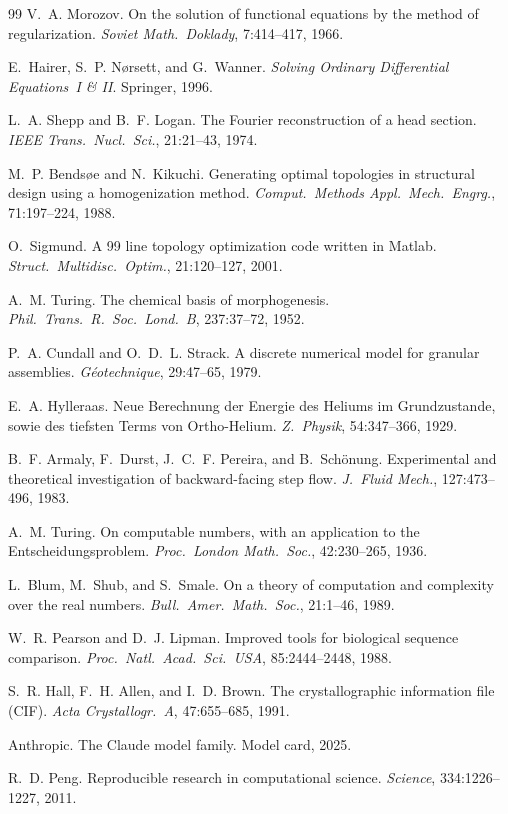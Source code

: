 \documentclass[11pt,a4paper]{article}
\begin{document}
\begin{thebibliography}{99}
V.~A. Morozov. On the solution of functional equations by the method of regularization. \emph{Soviet Math.\ Doklady}, 7:414--417, 1966.

E.~Hairer, S.~P. N{\o}rsett, and G.~Wanner. \emph{Solving Ordinary Differential Equations~I \& II}. Springer, 1996.


L.~A. Shepp and B.~F. Logan. The Fourier reconstruction of a head section. \emph{IEEE Trans.\ Nucl.\ Sci.}, 21:21--43, 1974.

M.~P. Bends{\o}e and N.~Kikuchi. Generating optimal topologies in structural design using a homogenization method. \emph{Comput.\ Methods Appl.\ Mech.\ Engrg.}, 71:197--224, 1988.

O.~Sigmund. A 99 line topology optimization code written in {Matlab}. \emph{Struct.\ Multidisc.\ Optim.}, 21:120--127, 2001.

A.~M. Turing. The chemical basis of morphogenesis. \emph{Phil.\ Trans.\ R.\ Soc.\ Lond.\ B}, 237:37--72, 1952.

P.~A. Cundall and O.~D.~L. Strack. A discrete numerical model for granular assemblies. \emph{G\'eotechnique}, 29:47--65, 1979.

E.~A. Hylleraas. Neue Berechnung der Energie des Heliums im Grundzustande, sowie des tiefsten Terms von Ortho-Helium. \emph{Z.\ Physik}, 54:347--366, 1929.

B.~F. Armaly, F.~Durst, J.~C.~F. Pereira, and B.~Sch{\"o}nung. Experimental and theoretical investigation of backward-facing step flow. \emph{J.\ Fluid Mech.}, 127:473--496, 1983.


A.~M. Turing. On computable numbers, with an application to the {E}ntscheidungsproblem. \emph{Proc.\ London Math.\ Soc.}, 42:230--265, 1936.

L.~Blum, M.~Shub, and S.~Smale. On a theory of computation and complexity over the real numbers. \emph{Bull.\ Amer.\ Math.\ Soc.}, 21:1--46, 1989.


W.~R. Pearson and D.~J. Lipman. Improved tools for biological sequence comparison. \emph{Proc.\ Natl.\ Acad.\ Sci.\ USA}, 85:2444--2448, 1988.

S.~R. Hall, F.~H. Allen, and I.~D. Brown. The crystallographic information file ({CIF}). \emph{Acta Crystallogr.\ A}, 47:655--685, 1991.



Anthropic. The {Claude} model family. Model card, 2025.


R.~D. Peng. Reproducible research in computational science. \emph{Science}, 334:1226--1227, 2011.

\end{thebibliography}
\end{document}

